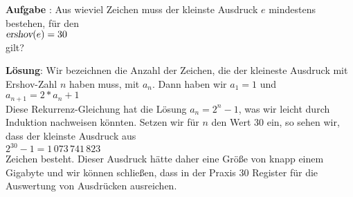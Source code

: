 \documentclass{article}
\newcounter{aufgabe}
\newcommand{\exercise}{\vspace*{0.1cm}

\stepcounter{aufgabe}
\vspace*{0.3cm}

\noindent
\textbf{Aufgabe \arabic{aufgabe}}: }
\newcommand{\solution}{
\vspace*{0.3cm}

\noindent
\textbf{L\"osung}: }
\begin{document}
\noindent
{}
\exercise
Aus wieviel Zeichen muss der kleinste Ausdruck $e$ mindestens bestehen, f\"ur den
\\[0.2cm]
\hspace*{1.3cm}
$\textsl{ershov}(e) = 30$
\\[0.2cm]
gilt?

\solution
Wir bezeichnen die Anzahl der Zeichen, die der kleineste Ausdruck mit Ershov-Zahl $n$ haben muss,
mit $a_n$.  Dann haben wir $a_1 = 1$ und 
\\[0.2cm]
\hspace*{1.3cm}
$a_{n+1} = 2 * a_n + 1$
\\[0.2cm]
Diese Rekurrenz-Gleichung hat die L\"osung $a_{n} = 2^n - 1$, was wir leicht durch Induktion nachweisen k\"onnten.
Setzen wir f\"ur $n$ den Wert $30$ ein, so sehen wir, dass der kleinste Ausdruck aus
\\[0.2cm]
\hspace*{1.3cm}
$2^{30} - 1 = 1\,073\,741\,823$
\\[0.2cm]
Zeichen besteht.  Dieser Ausdruck h\"atte daher eine Gr\"o{\ss}e von knapp einem Gigabyte und wir k\"onnen
schlie{\ss}en, dass in der Praxis 30 Register f\"ur die Auswertung von Ausdr\"ucken ausreichen.
\end{document}

